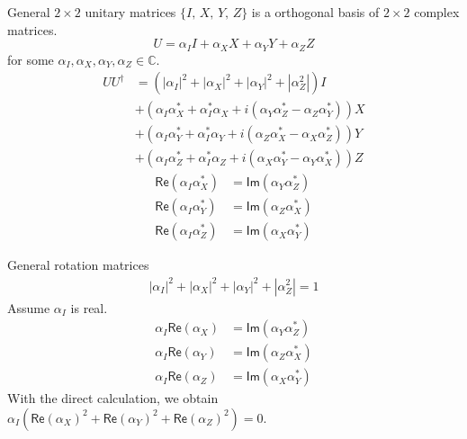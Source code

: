 \documentclass{beamer}
\begin{document}
\begin{frame}{General $2\times 2$ unitary matrices}
$\{I,\,X,\,Y,\,Z\}$ is a orthogonal basis of $2\times 2$ complex matrices.
\begin{equation*}
U=\alpha_I I + \alpha_X X + \alpha_Y Y + \alpha_Z Z 
\end{equation*}
for some $\alpha_I,\alpha_X,\alpha_Y,\alpha_Z\in\mathbb{C}$.
\begin{align*}
UU^\dagger&=(|\alpha_I|^2+|\alpha_X|^2+|\alpha_Y|^2+|\alpha_Z^2|)I\\
&+(\alpha_I\alpha_X^*+\alpha_I^*\alpha_X+i(\alpha_Y\alpha_Z^*-\alpha_Z\alpha_Y^*))X\\
&+(\alpha_I\alpha_Y^*+\alpha_I^*\alpha_Y+i(\alpha_Z\alpha_X^*-\alpha_X\alpha_Z^*))Y\\
&+(\alpha_I\alpha_Z^*+\alpha_I^*\alpha_Z+i(\alpha_X\alpha_Y^*-\alpha_Y\alpha_X^*))Z
\end{align*}
\begin{align*}
\mathsf{Re}(\alpha_I\alpha_X^*) &= \mathsf{Im}(\alpha_Y\alpha_Z^*)\\
\mathsf{Re}(\alpha_I\alpha_Y^*) &= \mathsf{Im}(\alpha_Z\alpha_X^*)\\
\mathsf{Re}(\alpha_I\alpha_Z^*) &= \mathsf{Im}(\alpha_X\alpha_Y^*)
\end{align*}
\end{frame}

\begin{frame}{General rotation matrices}
\begin{align*}
|\alpha_I|^2+|\alpha_X|^2+|\alpha_Y|^2+|\alpha_Z^2|=1
\end{align*}
Assume $\alpha_I$ is real.
\begin{align*}
\alpha_I\mathsf{Re}(\alpha_X) &= \mathsf{Im}(\alpha_Y\alpha_Z^*)\\
\alpha_I\mathsf{Re}(\alpha_Y) &= \mathsf{Im}(\alpha_Z\alpha_X^*)\\
\alpha_I\mathsf{Re}(\alpha_Z) &= \mathsf{Im}(\alpha_X\alpha_Y^*)
\end{align*}
With the direct calculation, we obtain $\alpha_I(\mathsf{Re}(\alpha_X)^2+\mathsf{Re}(\alpha_Y)^2+\mathsf{Re}(\alpha_Z)^2)=0$.
\end{frame}
\fi
\end{document}
